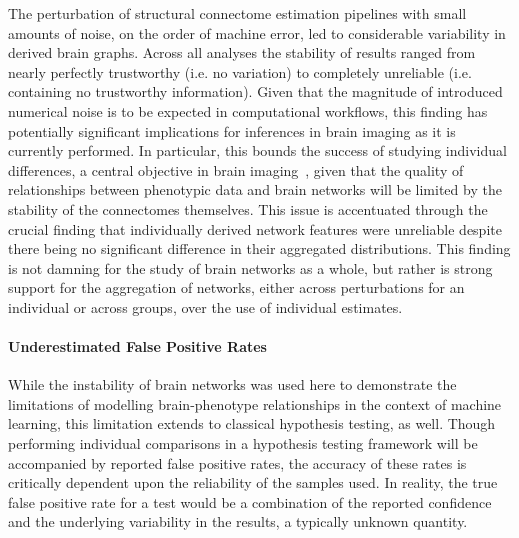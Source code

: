 \documentclass[fleqn,10pt]{SelfArx} %
\begin{document}
The perturbation of structural connectome estimation pipelines with small amounts of noise, on the order of machine
error, led to considerable variability in derived brain graphs. Across all analyses the stability of results ranged
from nearly perfectly trustworthy (i.e. no variation) to completely unreliable (i.e. containing no trustworthy
information). Given that the magnitude of introduced numerical noise is to be expected in computational workflows, this
finding has potentially significant implications for inferences in brain imaging as it is currently performed. In
particular, this bounds the success of studying individual differences, a central objective in brain
imaging~\cite{Dubois2016-yr}, given that the quality of relationships between phenotypic data and brain networks will
be limited by the stability of the connectomes themselves. This issue is accentuated through the crucial finding that
individually derived network features were unreliable despite there being no significant difference in their aggregated
distributions. This finding is not damning for the study of brain networks as a whole, but rather is strong support for
the aggregation of networks, either across perturbations for an individual or across groups, over the use of individual
estimates.

\paragraph{Underestimated False Positive Rates}
While the instability of brain networks was used here to demonstrate the limitations of modelling brain-phenotype
relationships in the context of machine learning, this limitation extends to classical hypothesis testing, as well.
Though performing individual comparisons in a hypothesis testing framework will be accompanied by reported false
positive rates, the accuracy of these rates is critically dependent upon the reliability of the samples used. In
reality, the true false positive rate for a test would be a combination of the reported confidence and the underlying
variability in the results, a typically unknown quantity.
\end{document}
